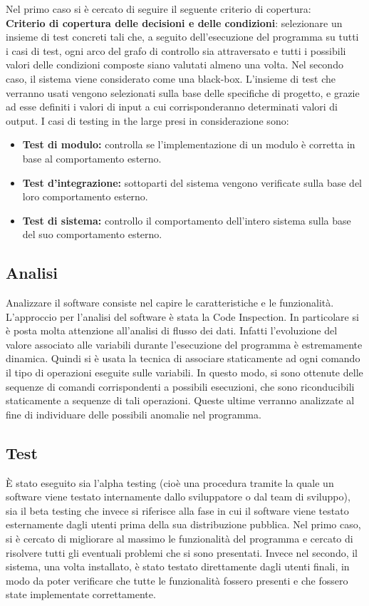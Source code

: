 \documentclass[a4paper,final,12pt]{report}
\begin{document}
Nel primo caso si è cercato di seguire il seguente criterio di copertura:\\
\textbf{Criterio di copertura delle decisioni e delle condizioni}: selezionare un insieme di test concreti tali che, a seguito dell'esecuzione del programma su tutti i casi di test, ogni arco del grafo di controllo sia attraversato e tutti i possibili valori delle condizioni composte siano valutati almeno una volta.
Nel secondo caso, il sistema viene considerato come una black-box. L'insieme di test che verranno usati vengono selezionati sulla base delle specifiche di progetto, e grazie ad esse definiti i valori di input a cui corrisponderanno determinati valori di output. 
I casi di testing in the large presi in considerazione sono:
\begin{itemize}
\item \textbf{Test di modulo:} controlla se l'implementazione di un modulo è corretta in base al comportamento esterno.
\item \textbf{Test d'integrazione:} sottoparti del sistema vengono verificate sulla base del loro comportamento esterno.
\item \textbf{Test di sistema:} controllo il comportamento dell'intero sistema sulla  base del suo comportamento esterno. 
\end{itemize}

\subsection{Analisi}
Analizzare il software consiste nel capire le caratteristiche e le funzionalità.
L'approccio per l'analisi del software è stata la Code Inspection. In particolare si è posta molta attenzione all'analisi di flusso dei dati.
Infatti l'evoluzione del valore associato alle variabili durante l'esecuzione del programma è estremamente dinamica. Quindi si è usata la tecnica di associare staticamente ad ogni comando il tipo di operazioni eseguite sulle variabili. In questo modo, si sono ottenute delle sequenze di comandi corrispondenti a possibili esecuzioni, che sono riconducibili staticamente a sequenze di tali operazioni. Queste ultime verranno analizzate al fine di individuare delle possibili anomalie nel programma.

\subsection{Test}
È stato eseguito sia l'alpha testing (cioè una procedura tramite la quale un software viene testato internamente dallo sviluppatore o dal team di sviluppo), sia il beta testing che invece si riferisce alla fase in cui il software viene testato esternamente dagli utenti prima della sua distribuzione pubblica. Nel primo caso, si è cercato di migliorare al massimo le funzionalità del programma e cercato di risolvere tutti gli eventuali problemi che si sono presentati. Invece nel secondo, il sistema, una volta installato, è stato testato direttamente dagli utenti finali, in modo da poter verificare che tutte le funzionalità fossero presenti e che fossero state implementate correttamente.
\end{document}
